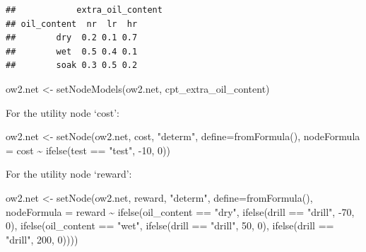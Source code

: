 \documentclass[
]{article}
\newenvironment{Shaded}{\begin{snugshade}}{\end{snugshade}}
\newcommand{\AttributeTok}[1]{\textcolor[rgb]{0.77,0.63,0.00}{#1}}
\newcommand{\DecValTok}[1]{\textcolor[rgb]{0.00,0.00,0.81}{#1}}
\newcommand{\FunctionTok}[1]{\textcolor[rgb]{0.00,0.00,0.00}{#1}}
\newcommand{\NormalTok}[1]{#1}
\newcommand{\OtherTok}[1]{\textcolor[rgb]{0.56,0.35,0.01}{#1}}
\newcommand{\SpecialCharTok}[1]{\textcolor[rgb]{0.00,0.00,0.00}{#1}}
\newcommand{\StringTok}[1]{\textcolor[rgb]{0.31,0.60,0.02}{#1}}
\begin{document}
\begin{verbatim}
##            extra_oil_content
## oil_content  nr  lr  hr
##        dry  0.2 0.1 0.7
##        wet  0.5 0.4 0.1
##        soak 0.3 0.5 0.2
\end{verbatim}

\begin{Shaded}
\begin{Highlighting}[]
\NormalTok{ow2.net }\OtherTok{\textless{}{-}} \FunctionTok{setNodeModels}\NormalTok{(ow2.net, cpt\_extra\_oil\_content)}
\end{Highlighting}
\end{Shaded}

For the utility node `cost':

\begin{Shaded}
\begin{Highlighting}[]
\NormalTok{ow2.net }\OtherTok{\textless{}{-}} \FunctionTok{setNode}\NormalTok{(ow2.net, cost, }\StringTok{"determ"}\NormalTok{, }\AttributeTok{define=}\FunctionTok{fromFormula}\NormalTok{(),}
                  \AttributeTok{nodeFormula =}\NormalTok{ cost }\SpecialCharTok{\textasciitilde{}} \FunctionTok{ifelse}\NormalTok{(test }\SpecialCharTok{==} \StringTok{"test"}\NormalTok{, }\SpecialCharTok{{-}}\DecValTok{10}\NormalTok{, }\DecValTok{0}\NormalTok{))}
\end{Highlighting}
\end{Shaded}

For the utility node `reward':

\begin{Shaded}
\begin{Highlighting}[]
\NormalTok{ow2.net }\OtherTok{\textless{}{-}} \FunctionTok{setNode}\NormalTok{(ow2.net, reward, }\StringTok{"determ"}\NormalTok{, }\AttributeTok{define=}\FunctionTok{fromFormula}\NormalTok{(),}
                  \AttributeTok{nodeFormula =}\NormalTok{ reward }\SpecialCharTok{\textasciitilde{}} \FunctionTok{ifelse}\NormalTok{(oil\_content }\SpecialCharTok{==} \StringTok{"dry"}\NormalTok{,}
                                                      \FunctionTok{ifelse}\NormalTok{(drill }\SpecialCharTok{==} \StringTok{"drill"}\NormalTok{, }\SpecialCharTok{{-}}\DecValTok{70}\NormalTok{, }\DecValTok{0}\NormalTok{),}
                                                      \FunctionTok{ifelse}\NormalTok{(oil\_content }\SpecialCharTok{==} \StringTok{"wet"}\NormalTok{,}
                                                             \FunctionTok{ifelse}\NormalTok{(drill }\SpecialCharTok{==} \StringTok{"drill"}\NormalTok{, }\DecValTok{50}\NormalTok{, }\DecValTok{0}\NormalTok{),}
                                                             \FunctionTok{ifelse}\NormalTok{(drill }\SpecialCharTok{==} \StringTok{"drill"}\NormalTok{, }\DecValTok{200}\NormalTok{, }\DecValTok{0}\NormalTok{))))}
\end{Highlighting}
\end{Shaded}
\end{document}

